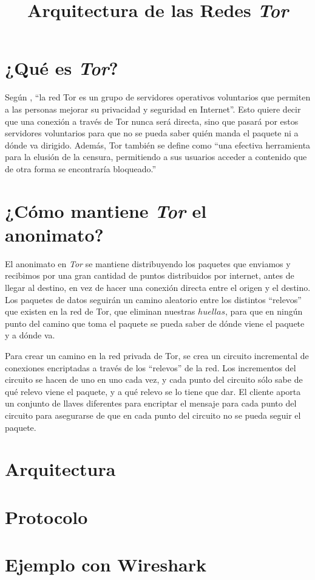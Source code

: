 \documentclass[10pt,a4paper,spanish]{article}
\title{\Huge Arquitectura de las Redes \textit{Tor}}
\begin{document}
\renewcommand{\tablename}{Tabla}
\maketitle

\section{¿Qué es \textit{Tor}?}
Según \cite{deftor}, ``la red Tor es un grupo de servidores operativos voluntarios que permiten a las personas mejorar su privacidad y seguridad en Internet''. Esto quiere decir que una conexión a través de Tor nunca será directa, sino que pasará por estos servidores voluntarios para que no se pueda saber quién manda el paquete ni a dónde va dirigido. Además, Tor también se define como ``una efectiva herramienta para la elusión de la censura, permitiendo a sus usuarios acceder a contenido que de otra forma se encontraría bloqueado.''

\section{¿Cómo mantiene \textit{Tor} el anonimato?}

El anonimato en \textit{Tor} se mantiene distribuyendo los paquetes que enviamos y recibimos por una gran cantidad de puntos distribuidos por internet, antes de llegar al destino, en vez de hacer una conexión directa entre el origen y el destino. Los paquetes de datos seguirán un camino aleatorio entre los distintos ``relevos'' que existen en la red de Tor, que eliminan nuestras $huellas$, para que en ningún punto del camino que toma el paquete se pueda saber de dónde viene el paquete y a dónde va.

Para crear un camino en la red privada de Tor, se crea un circuito incremental de conexiones encriptadas a través de los ``relevos'' de la red. Los incrementos del circuito se hacen de uno en uno cada vez, y cada punto del circuito sólo sabe de qué relevo viene el paquete, y a qué relevo se lo tiene que dar. El cliente aporta un conjunto de llaves diferentes para encriptar el mensaje para cada punto del circuito para asegurarse de que en cada punto del circuito no se pueda seguir el paquete.

\section{Arquitectura}

\section{Protocolo}

\section{Ejemplo con Wireshark}

\end{document}
